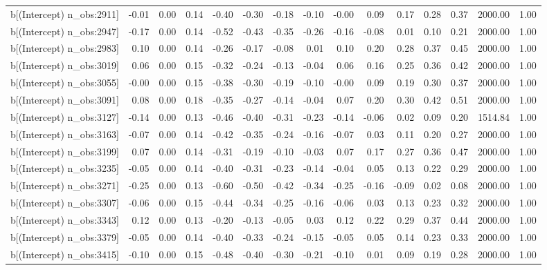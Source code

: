 \begin{table}[ht]
\begin{tabular}{rrrrrrrrrrrrrrr}
  b[(Intercept) n\_obs:2911] & -0.01 & 0.00 & 0.14 & -0.40 & -0.30 & -0.18 & -0.10 & -0.00 & 0.09 & 0.17 & 0.28 & 0.37 & 2000.00 & 1.00 \\ 
  b[(Intercept) n\_obs:2947] & -0.17 & 0.00 & 0.14 & -0.52 & -0.43 & -0.35 & -0.26 & -0.16 & -0.08 & 0.01 & 0.10 & 0.21 & 2000.00 & 1.00 \\ 
  b[(Intercept) n\_obs:2983] & 0.10 & 0.00 & 0.14 & -0.26 & -0.17 & -0.08 & 0.01 & 0.10 & 0.20 & 0.28 & 0.37 & 0.45 & 2000.00 & 1.00 \\ 
  b[(Intercept) n\_obs:3019] & 0.06 & 0.00 & 0.15 & -0.32 & -0.24 & -0.13 & -0.04 & 0.06 & 0.16 & 0.25 & 0.36 & 0.42 & 2000.00 & 1.00 \\ 
  b[(Intercept) n\_obs:3055] & -0.00 & 0.00 & 0.15 & -0.38 & -0.30 & -0.19 & -0.10 & -0.00 & 0.09 & 0.19 & 0.30 & 0.37 & 2000.00 & 1.00 \\ 
  b[(Intercept) n\_obs:3091] & 0.08 & 0.00 & 0.18 & -0.35 & -0.27 & -0.14 & -0.04 & 0.07 & 0.20 & 0.30 & 0.42 & 0.51 & 2000.00 & 1.00 \\ 
  b[(Intercept) n\_obs:3127] & -0.14 & 0.00 & 0.13 & -0.46 & -0.40 & -0.31 & -0.23 & -0.14 & -0.06 & 0.02 & 0.09 & 0.20 & 1514.84 & 1.00 \\ 
  b[(Intercept) n\_obs:3163] & -0.07 & 0.00 & 0.14 & -0.42 & -0.35 & -0.24 & -0.16 & -0.07 & 0.03 & 0.11 & 0.20 & 0.27 & 2000.00 & 1.00 \\ 
  b[(Intercept) n\_obs:3199] & 0.07 & 0.00 & 0.14 & -0.31 & -0.19 & -0.10 & -0.03 & 0.07 & 0.17 & 0.27 & 0.36 & 0.47 & 2000.00 & 1.00 \\ 
  b[(Intercept) n\_obs:3235] & -0.05 & 0.00 & 0.14 & -0.40 & -0.31 & -0.23 & -0.14 & -0.04 & 0.05 & 0.13 & 0.22 & 0.29 & 2000.00 & 1.00 \\ 
  b[(Intercept) n\_obs:3271] & -0.25 & 0.00 & 0.13 & -0.60 & -0.50 & -0.42 & -0.34 & -0.25 & -0.16 & -0.09 & 0.02 & 0.08 & 2000.00 & 1.00 \\ 
  b[(Intercept) n\_obs:3307] & -0.06 & 0.00 & 0.15 & -0.44 & -0.34 & -0.25 & -0.16 & -0.06 & 0.03 & 0.13 & 0.23 & 0.32 & 2000.00 & 1.00 \\ 
  b[(Intercept) n\_obs:3343] & 0.12 & 0.00 & 0.13 & -0.20 & -0.13 & -0.05 & 0.03 & 0.12 & 0.22 & 0.29 & 0.37 & 0.44 & 2000.00 & 1.00 \\ 
  b[(Intercept) n\_obs:3379] & -0.05 & 0.00 & 0.14 & -0.40 & -0.33 & -0.24 & -0.15 & -0.05 & 0.05 & 0.14 & 0.23 & 0.33 & 2000.00 & 1.00 \\ 
  b[(Intercept) n\_obs:3415] & -0.10 & 0.00 & 0.15 & -0.48 & -0.40 & -0.30 & -0.21 & -0.10 & 0.01 & 0.09 & 0.19 & 0.28 & 2000.00 & 1.00 \\ 

\end{tabular}
\end{table}
